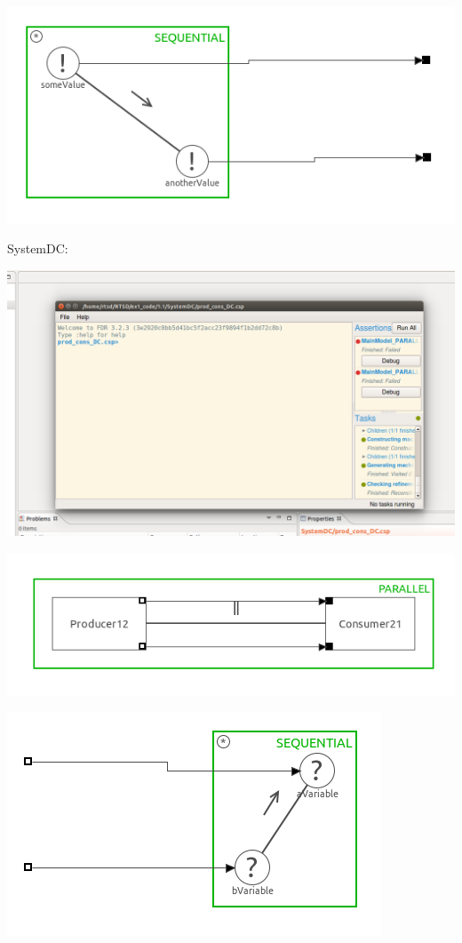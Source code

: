 \documentclass[a4paper,twoside,11pt]{article}
\begin{document}
	\centerline{\includegraphics[width=\linewidth]{./images/1_1-SystemDF_prod.png}}

SystemDC:\\
	\centerline{\includegraphics[width=\linewidth]{./images/1_1-SystemDC.png}}
	\centerline{\includegraphics[width=\linewidth]{./images/1_1-SystemDC_main.png}}
	\centerline{\includegraphics[width=\linewidth]{./images/1_1-SystemDC_cons.png}}
\end{document}
